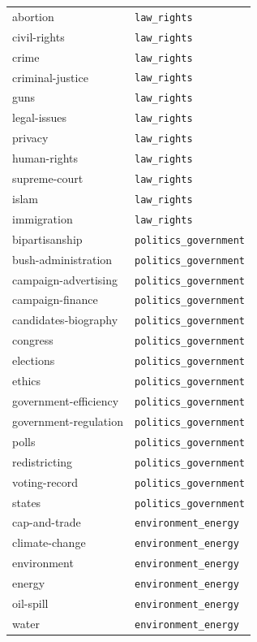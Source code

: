 \begin{longtable}{ll}
\midrule
abortion & \texttt{law\_rights} \\
civil-rights & \texttt{law\_rights} \\
crime & \texttt{law\_rights} \\
criminal-justice & \texttt{law\_rights} \\
guns & \texttt{law\_rights} \\
legal-issues & \texttt{law\_rights} \\
privacy & \texttt{law\_rights} \\
human-rights & \texttt{law\_rights} \\
supreme-court & \texttt{law\_rights} \\
islam & \texttt{law\_rights} \\
immigration & \texttt{law\_rights} \\
\midrule
bipartisanship & \texttt{politics\_government} \\
bush-administration & \texttt{politics\_government} \\
campaign-advertising & \texttt{politics\_government} \\
campaign-finance & \texttt{politics\_government} \\
candidates-biography & \texttt{politics\_government} \\
congress & \texttt{politics\_government} \\
elections & \texttt{politics\_government} \\
ethics & \texttt{politics\_government} \\
government-efficiency & \texttt{politics\_government} \\
government-regulation & \texttt{politics\_government} \\
polls & \texttt{politics\_government} \\
redistricting & \texttt{politics\_government} \\
voting-record & \texttt{politics\_government} \\
states & \texttt{politics\_government} \\
\midrule
cap-and-trade & \texttt{environment\_energy} \\
climate-change & \texttt{environment\_energy} \\
environment & \texttt{environment\_energy} \\
energy & \texttt{environment\_energy} \\
oil-spill & \texttt{environment\_energy} \\
water & \texttt{environment\_energy} \\

\end{longtable}
